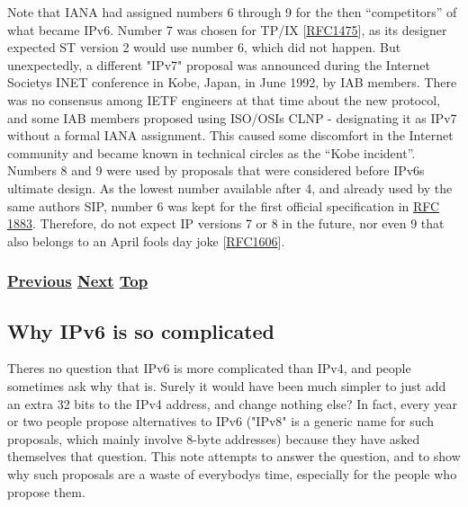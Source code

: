 \documentclass[
]{article}
\begin{document}
Note that IANA had assigned numbers 6 through 9 for the then
``competitors'' of what became IPv6. Number 7 was chosen for TP/IX
{[}\href{https://www.rfc-editor.org/info/rfc1475}{RFC1475}{]}, as its
designer expected ST version 2 would use number 6, which did not happen.
But unexpectedly, a different "IPv7" proposal was announced during the
Internet Society\textquotesingle s INET conference in Kobe, Japan, in
June 1992, by IAB members. There was no consensus among IETF engineers
at that time about the new protocol, and some IAB members proposed using
ISO/OSI\textquotesingle s CLNP - designating it as IPv7 without a formal
IANA assignment. This caused some discomfort in the Internet community
and became known in technical circles as the ``Kobe incident''. Numbers
8 and 9 were used by proposals that were considered before
IPv6\textquotesingle s ultimate design. As the lowest number available
after 4, and already used by the same author\textquotesingle s SIP,
number 6 was kept for the first official specification in
\href{https://www.rfc-editor.org/info/rfc1883}{RFC 1883}. Therefore, do
not expect IP versions 7 or 8 in the future, nor even 9 that also
belongs to an April fool\textquotesingle s day joke
{[}\href{https://www.rfc-editor.org/info/rfc1606}{RFC1606}{]}.

\subsubsection{\texorpdfstring{\hyperref[acknowledgments]{Previous}
\hyperref[why-ipv6-is-so-complicated]{Next}
\hyperref[introduction-and-foreword]{Top}}{Previous Next Top}}\label{previous-next-top-7}

\pagebreak

\subsection{Why IPv6 is so
complicated}\label{why-ipv6-is-so-complicated}

There\textquotesingle s no question that IPv6 is more complicated than
IPv4, and people sometimes ask why that is. Surely it would have been
much simpler to just add an extra 32 bits to the IPv4 address, and
change nothing else? In fact, every year or two people propose
alternatives to IPv6 ("IPv8" is a generic name for such proposals, which
mainly involve 8-byte addresses) because they have asked themselves that
question. This note attempts to answer the question, and to show why
such proposals are a waste of everybody\textquotesingle s time,
especially for the people who propose them.
\end{document}

